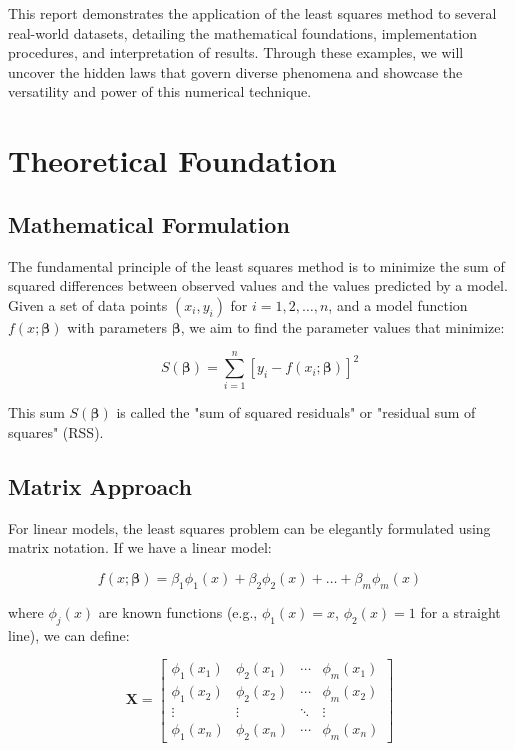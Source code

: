 \documentclass[12pt]{article}
\begin{document}
This report demonstrates the application of the least squares method to several real-world datasets, detailing the mathematical foundations, implementation procedures, and interpretation of results. Through these examples, we will uncover the hidden laws that govern diverse phenomena and showcase the versatility and power of this numerical technique.

\section{Theoretical Foundation}

\subsection{Mathematical Formulation}

The fundamental principle of the least squares method is to minimize the sum of squared differences between observed values and the values predicted by a model. Given a set of data points $(x_i, y_i)$ for $i = 1, 2, \ldots, n$, and a model function $f(x; \boldsymbol{\beta})$ with parameters $\boldsymbol{\beta}$, we aim to find the parameter values that minimize:

\begin{equation}
S(\boldsymbol{\beta}) = \sum_{i=1}^{n} [y_i - f(x_i; \boldsymbol{\beta})]^2
\end{equation}

This sum $S(\boldsymbol{\beta})$ is called the "sum of squared residuals" or "residual sum of squares" (RSS).

\subsection{Matrix Approach}

For linear models, the least squares problem can be elegantly formulated using matrix notation. If we have a linear model:

\begin{equation}
f(x; \boldsymbol{\beta}) = \beta_1 \phi_1(x) + \beta_2 \phi_2(x) + \ldots + \beta_m \phi_m(x)
\end{equation}

where $\phi_j(x)$ are known functions (e.g., $\phi_1(x) = x$, $\phi_2(x) = 1$ for a straight line), we can define:

\begin{equation}
\mathbf{X} = \begin{bmatrix} 
\phi_1(x_1) & \phi_2(x_1) & \cdots & \phi_m(x_1) \\
\phi_1(x_2) & \phi_2(x_2) & \cdots & \phi_m(x_2) \\
\vdots & \vdots & \ddots & \vdots \\
\phi_1(x_n) & \phi_2(x_n) & \cdots & \phi_m(x_n)
\end{bmatrix}
\end{equation}
\end{document}
